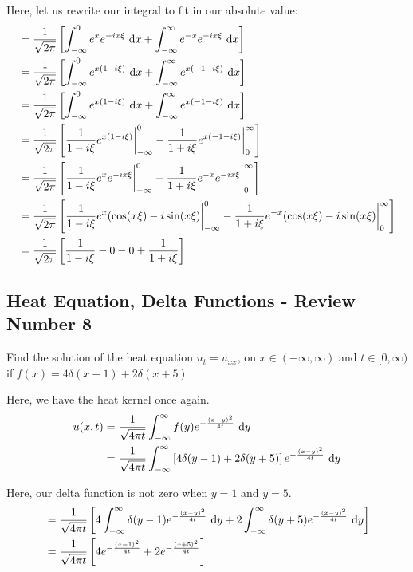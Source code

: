 Here, let us rewrite our integral to fit in our absolute value:
%
\begin{align}
  & = \frac{1}{\sqrt{2 \pi}}
  \left[
  \int^0_{-\infty} e^x e^{-i x \xi}\ \text dx +
  \int^\infty_{-\infty} e^{-x} e^{-i x \xi}\ \text dx
  \right]\\
  & = \frac{1}{\sqrt{2 \pi}}
  \left[
  \int^0_{-\infty} e^{x(1 - i \xi)}\ \text dx +
  \int^\infty_{-\infty} e^{x(-1 - i \xi)}\ \text dx
  \right]\\
  & = \frac{1}{\sqrt{2 \pi}}
  \left[
  \int^0_{-\infty} e^{x(1 - i \xi)}\ \text dx +
  \int^\infty_{-\infty} e^{x(-1 - i \xi)}\ \text dx
  \right]\\
  & = \frac{1}{\sqrt{2 \pi}}
  \left[
  \frac{1}{1 - i \xi} e^{x(1 - i \xi)} \bigg|^0_{-\infty} -
  \frac{1}{1 + i \xi} e^{x(-1 - i\xi)} \bigg|^\infty_0
  \right]\\
  & = \frac{1}{\sqrt{2 \pi}}
  \left[
  \frac{1}{1 - i \xi} e^{x} e^{-i x \xi} \bigg|^0_{-\infty} -
  \frac{1}{1 + i \xi} e^{-x}e^{-i x \xi} \bigg|^\infty_0
  \right]
  \\
  & = \frac{1}{\sqrt{2 \pi}}
  \left[
  \frac{1}{1 - i \xi} e^{x} (\cos(x \xi) - i\sin(x \xi) \bigg|^0_{-\infty} -
  \frac{1}{1 + i \xi} e^{-x}(\cos(x \xi) - i\sin(x \xi) \bigg|^\infty_0
  \right]\\
  & = \frac{1}{\sqrt{2 \pi}}
  \left[
  \frac{1}{1 - i\xi} - 0 - 0 + \frac{1}{1 + i \xi}
  \right]
\end{align}

\subsection*{Heat Equation, Delta Functions - Review Number 8}

Find the solution of the heat equation $u_t = u_{xx}$, on $x \in (-\infty, \infty)$ and $t \in [0, \infty)$ if $f(x) = 4 \delta(x - 1) + 2 \delta(x + 5)$

Here, we have the heat kernel once again.
%
\begin{align}
  u(x, t)
  & = \frac{1}{\sqrt{4 \pi t}} \int^\infty_{-\infty} f(y) e^{- \frac{(x - y)^2}{4t}}\ \text dy\\
  & = \frac{1}{\sqrt{4 \pi t}} \int^\infty_{-\infty}
  \left[
  4 \delta(y - 1) + 2 \delta(y + 5)
  \right]
  e^{-\frac{(x - y)^2}{4t}}\ \text dy
\end{align}

Here, our delta function is not zero when $y = 1$ and $y = 5$.
%
\begin{align}
  & = \frac{1}{\sqrt{4 \pi t}}
  \left[
  4 \int^\infty_{-\infty} \delta(y - 1) e^{-\frac{(x - y)^2}{4t}}\ \text dy +
  2 \int^\infty_{-\infty} \delta(y + 5) e^{-\frac{(x - y)^2}{4t}}\ \text dy
  \right]\\
  & = \frac{1}{\sqrt{4 \pi t}}
  \left[
  4 e^{- \frac{(x - 1)^2}{4t}} + 2e^{-\frac{(x + 5)^2}{4t}}
  \right]
\end{align}

